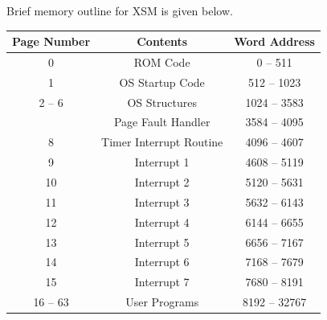 \documentclass[11pt]{report}
\begin{document}
Brief memory outline for XSM is given below.
\begin{center}
\begin{tabular}{|c|c|c|}
\hline \textbf{Page Number} & \textbf{Contents} & \textbf{Word Address}  \\ 
\hline 0 & ROM Code &  0 -- 511\\ 
1 & OS Startup Code & 512 -- 1023 \\ 
2 -- 6 & OS Structures  &  1024 -- 3583\\ 
 \rowcolor{gray!15}
\hline 7 & Page Fault Handler  &  3584 -- 4095\\ 
 \rowcolor{gray!15}
 8 & Timer Interrupt Routine  &  4096 -- 4607\\ 
 \rowcolor{gray!15}
 9 & Interrupt 1  &  4608 -- 5119\\ 
 \rowcolor{gray!15}
10 & Interrupt 2  &  5120 -- 5631\\ 
 \rowcolor{gray!15}
 11 & Interrupt 3  &  5632 -- 6143\\ 
 \rowcolor{gray!15}
 12 & Interrupt 4  &  6144 -- 6655\\ 
 \rowcolor{gray!15}
 13 & Interrupt 5  &  6656 -- 7167\\ 
 \rowcolor{gray!15}
 14 & Interrupt 6  &  7168 -- 7679\\
 \rowcolor{gray!15} 
 15 & Interrupt 7  &  7680 -- 8191\\ 
\hline 16 -- 63 & User Programs & 8192 -- 32767\\
\hline
\end{tabular} 
\end{center}
\end{document}
